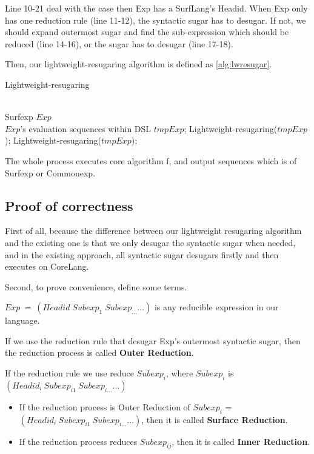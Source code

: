 Line 10-21 deal with the case then Exp has a SurfLang's Headid. When Exp only has one reduction rule (line 11-12), the syntactic sugar has to desugar. If not, we should expand outermost sugar and find the sub-expression which should be reduced (line 14-16), or the sugar has to desugar (line 17-18).


Then, our lightweight-resugaring algorithm is defined as \ref{alg:lwresugar}.

\begin{algorithm}
	\caption{Lightweight-resugaring}
	\label{alg:lwresugar}     %
	\begin{algorithmic}[1]       %
		\REQUIRE ~~\\      %
		Surfexp $Exp$
		\ENSURE ~~\\     %
		$Exp$'s evaluation sequences within DSL
		\RETURN
		\PRINT $tmpExp$;
		\STATE Lightweight-resugaring($tmpExp$);
		\ELSE 
		\STATE Lightweight-resugaring($tmpExp$);
		\ENDIF
		\ENDWHILE
		
	\end{algorithmic}
\end{algorithm}

The whole process executes core algorithm f, and output sequences which is of Surfexp or Commonexp.

\subsection{Proof of correctness}

First of all, because the difference between our lightweight resugaring algorithm and the existing one is that we only desugar the syntactic sugar when needed, and in the existing approach, all syntactic sugar desugars firstly and then executes on CoreLang.

Second, to prove convenience, define some terms.

$Exp~=~(Headid\;Subexp_{1}\;Subexp_{\ldots} \ldots)$ is any reducible expression in our language.

If we use the reduction rule that desugar Exp's outermost syntactic sugar, then the reduction process is called {\bfseries Outer Reduction}.

If the reduction rule we use reduce $Subexp_{i}$, where $Subexp_{i}$ is $(Headid_{i}~Subexp_{i1}~Subexp_{i\ldots} \ldots)$
\begin{itemize}
	\item If the reduction process is Outer Reduction of $Subexp_{i}$ = $(Headid_{i}~Subexp_{i1}~Subexp_{i\ldots} \ldots)$, then it is called {\bfseries Surface Reduction}.
	\item If the reduction process reduces $Subexp_{ij}$, then it is called {\bfseries Inner Reduction}.
\end{itemize}

